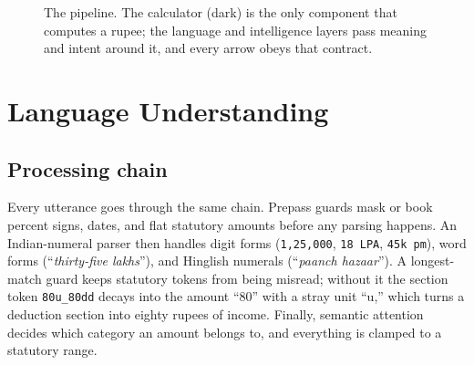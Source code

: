 \documentclass[conference]{IEEEtran}
\begin{document}
\begin{figure}[t]
\centering
{}
\caption{The pipeline. The calculator (dark) is the only component that
computes a rupee; the language and intelligence layers pass meaning and
intent around it, and every arrow obeys that contract.}
\label{fig:arch}
\end{figure}

\section{Language Understanding}
\subsection{Processing chain}
Every utterance goes through the same chain. Prepass guards mask or
book percent signs, dates, and flat statutory amounts before any
parsing happens. An Indian-numeral parser then handles digit forms
(\texttt{1,25,000}, \texttt{18~LPA}, \texttt{45k~pm}), word forms
(``\emph{thirty-five lakhs}''), and Hinglish numerals
(``\emph{paanch hazaar}''). A longest-match guard keeps statutory
tokens from being misread; without it the section token
\texttt{80u\_80dd} decays into the amount ``80'' with a stray unit
``u,'' which turns a deduction section into eighty rupees of income.
Finally, semantic attention decides which category an amount belongs
to, and everything is clamped to a statutory range.
\end{document}
